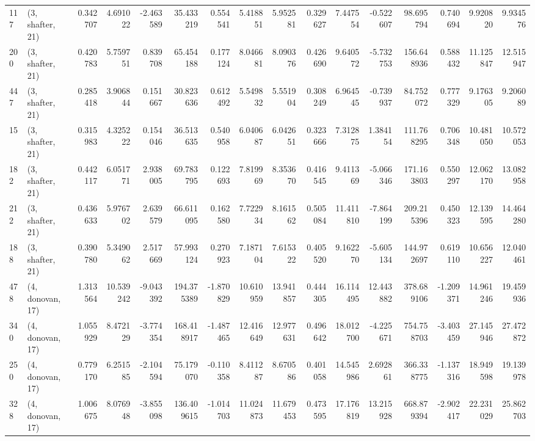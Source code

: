 \begin{tabular}{llrrrrrrrrrrrrrr}
117 &  (3, shafter, 21) &   0.342707 &   4.691022 &  -2.463589 &    35.433219 &   0.554541 &   5.418851 &   5.952581 &  0.329627 &   7.447554 &  -0.522607 &    98.695794 &   0.740694 &   9.920820 &   9.934576 \\
200 &  (3, shafter, 21) &   0.420783 &   5.759751 &   0.839708 &    65.454188 &   0.177124 &   8.046681 &   8.090376 &  0.426690 &   9.640572 &  -5.732753 &   156.648936 &   0.588432 &  11.125847 &  12.515947 \\
447 &  (3, shafter, 21) &   0.285418 &   3.906844 &   0.151667 &    30.823636 &   0.612492 &   5.549832 &   5.551904 &  0.308249 &   6.964545 &  -0.739937 &    84.752072 &   0.777329 &   9.176305 &   9.206089 \\
15  &  (3, shafter, 21) &   0.315983 &   4.325222 &   0.154046 &    36.513635 &   0.540958 &   6.040687 &   6.042651 &  0.323666 &   7.312875 &   1.384154 &   111.768295 &   0.706348 &  10.481050 &  10.572053 \\
182 &  (3, shafter, 21) &   0.442117 &   6.051771 &   2.938005 &    69.783795 &   0.122693 &   7.819969 &   8.353670 &  0.416545 &   9.411369 &  -5.066346 &   171.163803 &   0.550297 &  12.062170 &  13.082958 \\
212 &  (3, shafter, 21) &   0.436633 &   5.976702 &   2.639579 &    66.611095 &   0.162580 &   7.722934 &   8.161562 &  0.505084 &  11.411810 &  -7.864199 &   209.215396 &   0.450323 &  12.139595 &  14.464280 \\
188 &  (3, shafter, 21) &   0.390780 &   5.349062 &   2.517669 &    57.993124 &   0.270923 &   7.187104 &   7.615322 &  0.405520 &   9.162270 &  -5.605134 &   144.972697 &   0.619110 &  10.656227 &  12.040461 \\
478 &  (4, donovan, 17) &   1.313564 &  10.539242 &  -9.043392 &   194.375389 &  -1.870829 &  10.610959 &  13.941857 &  0.444305 &  16.114495 &  12.443882 &   378.689106 &  -1.209371 &  14.961246 &  19.459936 \\
340 &  (4, donovan, 17) &   1.055929 &   8.472129 &  -3.774354 &   168.418917 &  -1.487465 &  12.416649 &  12.977631 &  0.496642 &  18.012700 &  -4.225671 &   754.758703 &  -3.403459 &  27.145946 &  27.472872 \\
250 &  (4, donovan, 17) &   0.779170 &   6.251585 &  -2.104594 &    75.179070 &  -0.110358 &   8.411287 &   8.670586 &  0.401058 &  14.545986 &   2.692861 &   366.338775 &  -1.137316 &  18.949598 &  19.139978 \\
328 &  (4, donovan, 17) &   1.006675 &   8.076948 &  -3.855098 &   136.409615 &  -1.014703 &  11.024873 &  11.679453 &  0.473595 &  17.176819 &  13.215928 &   668.879394 &  -2.902417 &  22.231029 &  25.862703 \\

\end{tabular}
